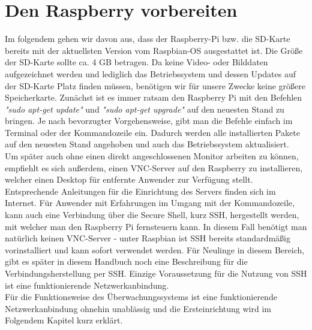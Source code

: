\documentclass[12pt,a4paper]{scrreprt}
\begin{document}
\section{Den Raspberry vorbereiten}
Im folgendem gehen wir davon aus, dass der Raspberry-Pi bzw. die SD-Karte bereits mit der aktuellsten Version vom Raspbian-OS ausgestattet ist. Die Größe der SD-Karte sollte ca. 4 GB betragen. Da keine Video- oder Bilddaten aufgezeichnet werden und lediglich das Betriebssystem und dessen Updates auf der SD-Karte Platz finden müssen, benötigen wir für unsere Zwecke keine größere Speicherkarte. Zunächst ist es immer ratsam den Raspberry Pi mit den Befehlen \textit{"sudo apt-get update"} und \textit{"sudo apt-get upgrade"} auf den neuesten Stand zu bringen. Je nach bevorzugter Vorgehensweise, gibt man die Befehle einfach im Terminal oder der Kommandozeile ein. Dadurch werden alle installierten Pakete auf den neuesten Stand angehoben und auch das Betriebssystem aktualisiert. \\Um später auch ohne einen direkt angeschlossenen Monitor arbeiten zu können, empfiehlt es sich außerdem, einen VNC-Server auf den Raspberry zu installieren, welcher einen Desktop für entfernte Anwender zur Verfügung stellt. Entsprechende Anleitungen für die Einrichtung des Servers finden sich im Internet. Für Anwender mit Erfahrungen im Umgang mit der Kommandozeile, kann auch eine Verbindung über die Secure Shell, kurz SSH, hergestellt werden, mit welcher man den Raspberry Pi fernsteuern kann. In diesem Fall benötigt man natürlich keinen VNC-Server - unter Raspbian ist SSH bereits standardmäßig vorinstalliert und kann sofort verwendet werden. Für Neulinge in diesem Bereich, gibt es später in diesem Handbuch noch eine Beschreibung für die Verbindungsherstellung per SSH. Einzige Voraussetzung für die Nutzung von SSH ist eine funktionierende Netzwerkanbindung. \\Für die Funktionsweise des Überwachungssystems ist eine funktionierende Netzwerkanbindung ohnehin unablässig und die Ersteinrichtung wird im Folgendem Kapitel kurz erklärt.
\end{document}
